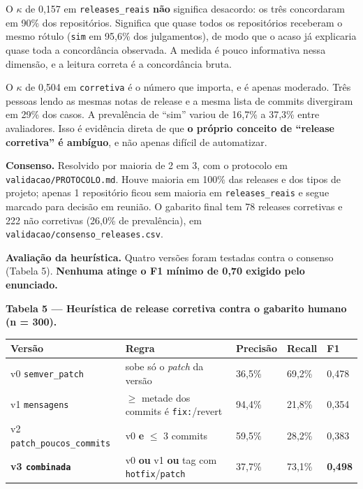 \documentclass[12pt]{article}
\begin{document}
O $\kappa$ de 0,157 em \texttt{releases\_reais} \textbf{não} significa desacordo: os três concordaram em 90\% dos repositórios. Significa que quase todos os repositórios receberam o mesmo rótulo (\texttt{sim} em 95,6\% dos julgamentos), de modo que o acaso já explicaria quase toda a concordância observada. A medida é pouco informativa nessa dimensão, e a leitura correta é a concordância bruta.

O $\kappa$ de 0,504 em \texttt{corretiva} é o número que importa, e é apenas moderado. Três pessoas lendo as mesmas notas de release e a mesma lista de commits divergiram em 29\% dos casos. A prevalência de ``sim'' variou de 16,7\% a 37,3\% entre avaliadores. Isso é evidência direta de que \textbf{o próprio conceito de ``release corretiva'' é ambíguo}, e não apenas difícil de automatizar.

\textbf{Consenso.} Resolvido por maioria de 2 em 3, com o protocolo em \texttt{validacao/PROTOCOLO.md}. Houve maioria em 100\% das releases e dos tipos de projeto; apenas 1 repositório ficou sem maioria em \texttt{releases\_reais} e segue marcado para decisão em reunião. O gabarito final tem 78 releases corretivas e 222 não corretivas (26,0\% de prevalência), em \texttt{validacao/consenso\_releases.csv}.

\textbf{Avaliação da heurística.} Quatro versões foram testadas contra o consenso (Tabela 5). \textbf{Nenhuma atinge o F1 mínimo de 0,70 exigido pelo enunciado.}

\textbf{Tabela 5 — Heurística de release corretiva contra o gabarito humano (n = 300).}

\begin{table}[!htbp]
\centering
\scriptsize
\begin{tabular}{p{}p{}p{}p{}p{}}
\toprule
\textbf{Versão} & \textbf{Regra} & \textbf{Precisão} & \textbf{Recall} & \textbf{F1} \\
\midrule
v0 \texttt{semver\_patch} & sobe só o \emph{patch} da versão & 36,5\% & 69,2\% & 0,478 \\
v1 \texttt{mensagens} & $\geq$ metade dos commits é \texttt{fix:}/revert & 94,4\% & 21,8\% & 0,354 \\
v2 \texttt{patch\_poucos\_commits} & v0 \textbf{e} $\leq$ 3 commits & 59,5\% & 28,2\% & 0,383 \\
\textbf{v3 \texttt{combinada}} & v0 \textbf{ou} v1 \textbf{ou} tag com \texttt{hotfix}/\texttt{patch} & 37,7\% & 73,1\% & \textbf{0,498} \\
\bottomrule
\end{tabular}
\end{table}
\end{document}
